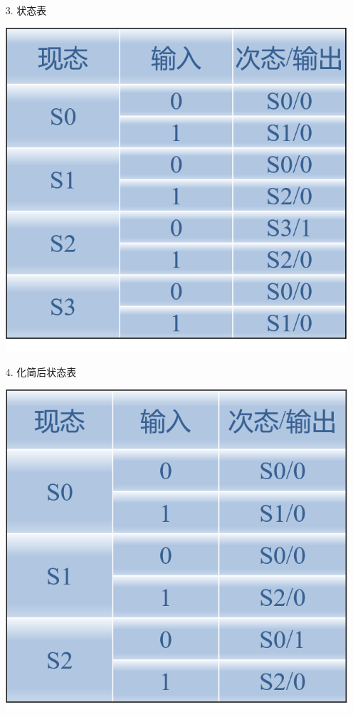 \documentclass[UTF8]{ctexart}
\begin{document}
\begin{enumerate}
\begin{itemize}
              \item [3.] 状态表              \\
                    \begin{center}
                        \includegraphics[scale = 0.6]{3.png}
                    \end{center}
              \item [4.] 化简后状态表              \\
                    \begin{center}
                        \includegraphics[scale = 0.6]{4.png}

\end{center}
\end{itemize}
\end{enumerate}
\end{document}
